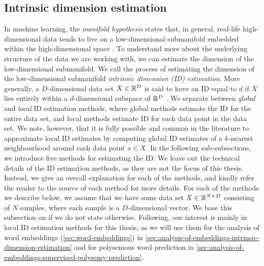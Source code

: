 \subsection{Intrinsic dimension estimation}
\label{sec:intrinsic-dimension-estimation}
In machine learning, the \textit{manifold hypothesis} states that, in general, real-life high-dimensional data tends to live on a low-dimensional submanifold embedded within the high-dimensional space \cite[p. 16]{bengio2014representation}. To understand more about the underlying structure of the data we are working with, we can estimate the dimension of the low-dimensional submanifold. We call the process of estimating the dimension of the low-dimensional submanifold \textit{intrinsic dimension (ID) estimation}. More generally, a $D$-dimensional data set $X \in \mathbb{R}^D$ is said to have an ID equal to $d$ if $X$ lies entirely within a $d$-dimensional subspace of $\mathbb{R}^D$ \cite{lee2015intrinsic}. We separate between \textit{global} and \textit{local} ID estimation methods, where global methods estimate the ID for the entire data set, and local methods estimate ID for each data point in the data set. We note, however, that it is fully possible and common in the literature to approximate local ID estimates by computing global ID estimates of a $k$-nearest neighbourhood around each data point $x \in X$. In the following sub-subsections, we introduce five methods for estimating the ID. We leave out the technical details of the ID estimation methods, as they are not the focus of this thesis. Instead, we give an overall explanation for each of the methods, and kindly refer the reader to the source of each method for more details. For each of the methods we describe below, we assume that we have some data set $X \in \mathbb{R}^{N \times D}$ consisting of $N$ samples, where each sample is a $D$-dimensional vector. We base this subsection on \cite{lee2015intrinsic} if we do not state otherwise. Following, our interest is mainly in local ID estimation methods for this thesis, as we will use them for the analysis of word embeddings (\cref{sec:word-embeddings}) in \cref{sec:analysis-of-embeddings-intrinsic-dimension-estimation} and for polysemous word prediction in \cref{sec:analysis-of-embeddings-supervised-polysemy-prediction}.

